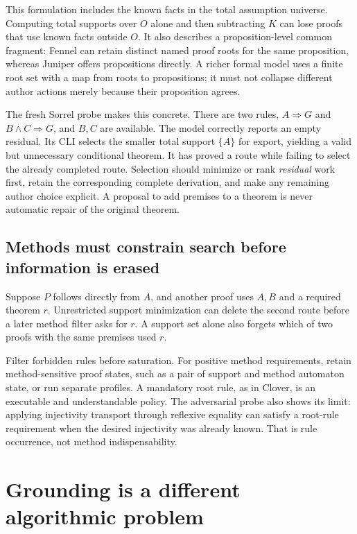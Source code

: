 \documentclass[11pt,letterpaper]{article}
\theoremstyle{definition}\newtheorem{definition}[proposition]{Definition}
\theoremstyle{remark}\newtheorem{remark}[proposition]{Remark}
\begin{document}
This formulation includes the known facts in the total assumption universe.
Computing total supports over $O$ alone and then subtracting $K$ can lose
proofs that use known facts outside $O$. It also describes a proposition-level
common fragment: Fennel can retain distinct named proof roots for the same
proposition, whereas Juniper offers propositions directly. A richer formal
model uses a finite root set with a map from roots to propositions; it must
not collapse different author actions merely because their proposition agrees.

The fresh Sorrel probe makes this concrete. There are two rules,
$A\Rightarrow G$ and $B\land C\Rightarrow G$, and $B,C$ are available.
The model correctly reports an empty residual. Its CLI selects the smaller
total support $\{A\}$ for export, yielding a valid but unnecessary conditional
theorem. It has proved a route while failing to select the already completed
route. Selection should minimize or rank \emph{residual} work first, retain
the corresponding complete derivation, and make any remaining author choice
explicit. A proposal to add premises to a theorem is never automatic repair
of the original theorem.

\subsection{Methods must constrain search before information is erased}

Suppose $P$ follows directly from $A$, and another proof uses $A,B$ and a
required theorem $r$. Unrestricted support minimization can delete the second
route before a later method filter asks for $r$. A support set alone also
forgets which of two proofs with the same premises used $r$.

Filter forbidden rules before saturation. For positive method requirements,
retain method-sensitive proof states, such as a pair of support and method
automaton state, or run separate profiles. A mandatory root rule, as in
Clover, is an executable and understandable policy. The adversarial probe
also shows its limit: applying injectivity transport through reflexive
equality can satisfy a root-rule requirement when the desired injectivity
was already known. That is rule occurrence, not method indispensability.

\section{Grounding is a different algorithmic problem}
\label{sec:grounding}
\end{document}
